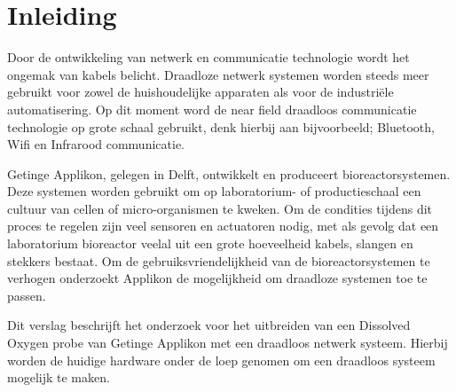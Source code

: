 \section*{Inleiding}
Door de ontwikkeling van netwerk en communicatie technologie wordt het ongemak van kabels belicht. Draadloze netwerk systemen worden steeds meer gebruikt voor zowel de huishoudelijke apparaten als voor de industri{\"e}le automatisering. Op dit moment word de near field draadloos communicatie technologie op grote schaal gebruikt, denk hierbij aan bijvoorbeeld; Bluetooth, Wifi en Infrarood communicatie. 

Getinge Applikon, gelegen in Delft, ontwikkelt en produceert bioreactorsystemen. Deze systemen worden gebruikt om op laboratorium- of productieschaal een cultuur van cellen of micro-organismen te kweken. Om de condities tijdens dit proces te regelen zijn veel sensoren en actuatoren nodig, met
als gevolg dat een laboratorium bioreactor veelal uit een grote hoeveelheid kabels, slangen en stekkers bestaat. Om de gebruiksvriendelijkheid van de bioreactorsystemen te verhogen onderzoekt Applikon de mogelijkheid om draadloze systemen toe te passen.

Dit verslag beschrijft het onderzoek voor het uitbreiden van een Dissolved Oxygen probe van Getinge Applikon met een draadloos netwerk systeem. Hierbij worden de huidige hardware onder de loep genomen om een draadloos systeem mogelijk te maken. 